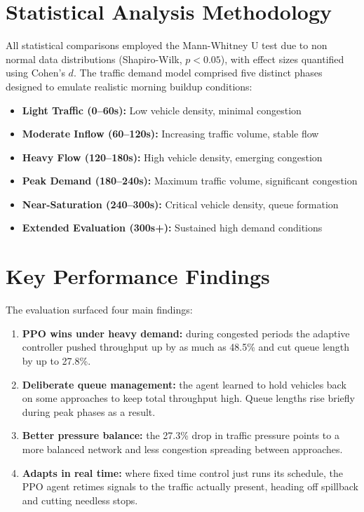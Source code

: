 ﻿\documentclass[11pt, a4paper]{report}
\begin{document}
\section{Statistical Analysis Methodology}

All statistical comparisons employed the Mann-Whitney U test due to non normal data distributions (Shapiro-Wilk, $p < 0.05$), with effect sizes quantified using Cohen's $d$. The traffic demand model comprised five distinct phases designed to emulate realistic morning buildup conditions:

\begin{itemize}
    \item \textbf{Light Traffic (0--60s):} Low vehicle density, minimal congestion
    \item \textbf{Moderate Inflow (60--120s):} Increasing traffic volume, stable flow
    \item \textbf{Heavy Flow (120--180s):} High vehicle density, emerging congestion
    \item \textbf{Peak Demand (180--240s):} Maximum traffic volume, significant congestion
    \item \textbf{Near-Saturation (240--300s):} Critical vehicle density, queue formation
    \item \textbf{Extended Evaluation (300s+):} Sustained high demand conditions
\end{itemize}
\section{Key Performance Findings}

The evaluation surfaced four main findings:

\begin{enumerate}
    \item \textbf{PPO wins under heavy demand:} during congested periods the adaptive controller pushed throughput up by as much as 48.5\% and cut queue length by up to 27.8\%.

    \item \textbf{Deliberate queue management:} the agent learned to hold vehicles back on some approaches to keep total throughput high. Queue lengths rise briefly during peak phases as a result.

    \item \textbf{Better pressure balance:} the 27.3\% drop in traffic pressure points to a more balanced network and less congestion spreading between approaches.

    \item \textbf{Adapts in real time:} where fixed time control just runs its schedule, the PPO agent retimes signals to the traffic actually present, heading off spillback and cutting needless stops.
\end{enumerate}
\end{document}
